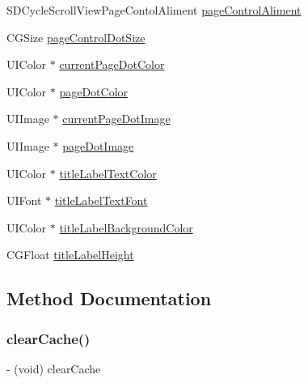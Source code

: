 \begin{DoxyCompactItemize}
\item 
S\+D\+Cycle\+Scroll\+View\+Page\+Contol\+Aliment \mbox{\hyperlink{interface_s_d_cycle_scroll_view_ab84f8e1470a1349790be0bd3f7dfd3b1}{page\+Control\+Aliment}}
\item 
C\+G\+Size \mbox{\hyperlink{interface_s_d_cycle_scroll_view_a6759748263c149c7b59b8768e785cae0}{page\+Control\+Dot\+Size}}
\item 
U\+I\+Color $\ast$ \mbox{\hyperlink{interface_s_d_cycle_scroll_view_aa4602dc48f5a3942242a0e8128b56ef6}{current\+Page\+Dot\+Color}}
\item 
U\+I\+Color $\ast$ \mbox{\hyperlink{interface_s_d_cycle_scroll_view_a36265062c9cb7c7bfc7e8550e3578277}{page\+Dot\+Color}}
\item 
U\+I\+Image $\ast$ \mbox{\hyperlink{interface_s_d_cycle_scroll_view_a957f241ff46139daf9a9989f1976ef9d}{current\+Page\+Dot\+Image}}
\item 
U\+I\+Image $\ast$ \mbox{\hyperlink{interface_s_d_cycle_scroll_view_a69506e03a82db15ce39e4f6a85025005}{page\+Dot\+Image}}
\item 
U\+I\+Color $\ast$ \mbox{\hyperlink{interface_s_d_cycle_scroll_view_ae38918d1595048b39193bc499372a8a4}{title\+Label\+Text\+Color}}
\item 
U\+I\+Font $\ast$ \mbox{\hyperlink{interface_s_d_cycle_scroll_view_a10df54e8c8df56f7f201c84181d97edf}{title\+Label\+Text\+Font}}
\item 
U\+I\+Color $\ast$ \mbox{\hyperlink{interface_s_d_cycle_scroll_view_a01cac7622770993efae61bfbbc5722d7}{title\+Label\+Background\+Color}}
\item 
C\+G\+Float \mbox{\hyperlink{interface_s_d_cycle_scroll_view_a4524278175283fcfec736cf14fdc7155}{title\+Label\+Height}}
\end{DoxyCompactItemize}


\subsection{Method Documentation}
\mbox{\label{interface_s_d_cycle_scroll_view_ad0b8cc314d8c7faa9b3ec3cf25bff771}} 
\subsubsection{\texorpdfstring{clear\+Cache()}{clearCache()}\hspace{0.1cm}{\footnotesize\ttfamily [1/3]}}
{\footnotesize\ttfamily -\/ (void) clear\+Cache \begin{DoxyParamCaption}{ }\end{DoxyParamCaption}}

